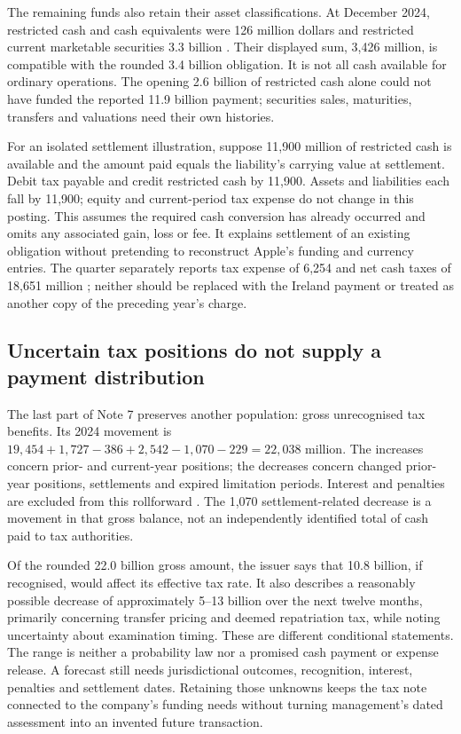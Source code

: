 The remaining funds also retain their asset classifications. At December 2024,
restricted cash and cash equivalents were 126 million dollars and restricted
current marketable securities 3.3 billion \citep[Note 4, printed p.~8]{apple2025q1}.
Their displayed sum, 3,426 million, is compatible with the rounded 3.4 billion
obligation. It is not all cash available for ordinary operations. The opening
2.6 billion of restricted cash alone could not have funded the reported
11.9 billion payment; securities sales, maturities, transfers and valuations
need their own histories.

For an isolated settlement illustration, suppose 11,900 million of restricted
cash is available and the amount paid equals the liability's carrying value
at settlement. Debit tax payable and credit restricted cash by 11,900. Assets
and liabilities each fall by 11,900; equity and current-period tax expense do
not change in this posting. This assumes the required cash conversion has
already occurred and omits any associated gain, loss or fee. It explains
settlement of an existing obligation without pretending to reconstruct Apple's
funding and currency entries. The quarter separately reports tax expense of
6,254 and net cash taxes of 18,651 million
\citep[printed pp.~1 and 5]{apple2025q1}; neither should be replaced with the
Ireland payment or treated as another copy of the preceding year's charge.

\subsection{Uncertain tax positions do not supply a payment distribution}

The last part of Note 7 preserves another population: gross unrecognised tax
benefits. Its 2024 movement is $19{,}454+1{,}727-386+2{,}542-1{,}070-229
=22{,}038$ million. The increases concern prior- and current-year positions;
the decreases concern changed prior-year positions, settlements and expired
limitation periods. Interest and penalties are excluded from this rollforward
\citep[Note 7, printed p.~41]{apple2024}. The 1,070 settlement-related decrease
is a movement in that gross balance, not an independently identified total of
cash paid to tax authorities.

Of the rounded 22.0 billion gross amount, the issuer says that 10.8 billion,
if recognised, would affect its effective tax rate. It also describes a
reasonably possible decrease of approximately 5--13 billion over the next
twelve months, primarily concerning transfer pricing and deemed repatriation
tax, while noting uncertainty about examination timing. These are different
conditional statements. The range is neither a probability law nor a promised
cash payment or expense release. A forecast still needs jurisdictional outcomes,
recognition, interest, penalties and settlement dates. Retaining those unknowns
keeps the tax note connected to the company's funding needs without turning
management's dated assessment into an invented future transaction.
